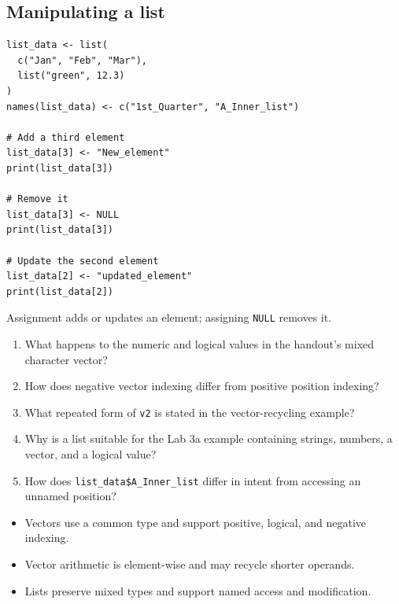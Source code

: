 \subsection{Manipulating a list}

\begin{lstlisting}[style=dsr]
list_data <- list(
  c("Jan", "Feb", "Mar"),
  list("green", 12.3)
)
names(list_data) <- c("1st_Quarter", "A_Inner_list")

# Add a third element
list_data[3] <- "New_element"
print(list_data[3])

# Remove it
list_data[3] <- NULL
print(list_data[3])

# Update the second element
list_data[2] <- "updated_element"
print(list_data[2])
\end{lstlisting}

Assignment adds or updates an element; assigning \texttt{NULL} removes it.

\begin{quickcheck}
\begin{enumerate}
  \item What happens to the numeric and logical values in the handout's mixed character vector?
  \item How does negative vector indexing differ from positive position indexing?
  \item What repeated form of \texttt{v2} is stated in the vector-recycling example?
  \item Why is a list suitable for the Lab 3a example containing strings, numbers, a vector, and a logical value?
  \item How does \texttt{list\_data\$A\_Inner\_list} differ in intent from accessing an unnamed position?
\end{enumerate}
\end{quickcheck}

\begin{chapterrecap}
\begin{itemize}
  \item Vectors use a common type and support positive, logical, and negative indexing.
  \item Vector arithmetic is element-wise and may recycle shorter operands.
  \item Lists preserve mixed types and support named access and modification.
\end{itemize}
\end{chapterrecap}
